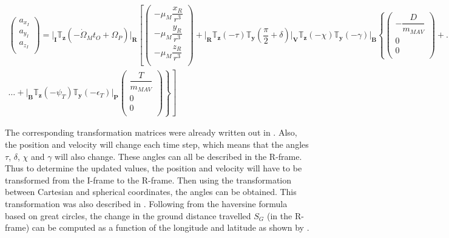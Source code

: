 \begin{multline} \label{eq:acc_ascent}
\begin{pmatrix}
a_{x_{I}}\\
a_{y_{I}}\\
a_{z_{I}}\\
\end{pmatrix}
=
\Bigg|_{\mathbf{I}}\mathbb{T}_{\mathbf{z}}\left(-\dot{\Omega}_{M}t_{O}+\Omega_{P}\right)\Bigg|_{\mathbf{R}}\left[
\begin{pmatrix}
-\mu_{M}\dfrac{x_{R}}{r^{3}}\\
-\mu_{M}\dfrac{y_{R}}{r^{3}}\\
-\mu_{M}\dfrac{z_{R}}{r^{3}}\\
\end{pmatrix}
+\Bigg|_{\mathbf{R}}\mathbb{T}_{\mathbf{z}}\left(-\tau\right)\mathbb{T}_{\mathbf{y}}\left(\dfrac{\pi}{2}+\delta\right)\Bigg|_{\mathbf{V}}\mathbb{T}_{\mathbf{z}}\left(-\chi\right)\mathbb{T}_{\mathbf{y}}\left(-\gamma\right)\Bigg|_{\mathbf{B}}\left\lbrace
\begin{pmatrix}
-\dfrac{D}{m_{MAV}}\\
0\\
0\\
\end{pmatrix}
+ \right. \right. \dots \\
\dots +
\left. \left.
\Bigg|_{\mathbf{B}}\mathbb{T}_{\mathbf{z}}\left(-\psi_{T}\right)\mathbb{T}_{\mathbf{y}}\left(-\epsilon_{T}\right)\Bigg|_{\mathbf{P}}
\begin{pmatrix}
\dfrac{T}{m_{MAV}}\\
0\\
0\\
\end{pmatrix}
\right\rbrace
\right]
\end{multline}

The corresponding transformation matrices were already written out in . Also, the position and velocity will change each time step, which means that the angles $\tau$, $\delta$, $\chi$ and $\gamma$ will also change. These angles can all be described in the R-frame. Thus to determine the updated values, the position and velocity will have to be transformed from the I-frame to the R-frame. Then using the transformation between Cartesian and spherical coordinates, the angles can be obtained. This transformation was also described in . Following from the haversine formula based on great circles, the change in the ground distance travelled $S_{G}$ (in the R-frame) can be computed as a function of the longitude and latitude as shown by . 

